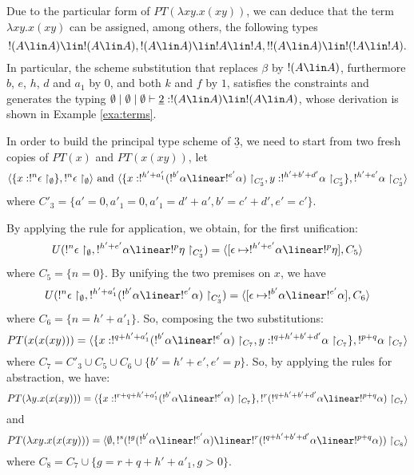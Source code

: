 \begin{exa}
  Due to the particular form of $PT(\lambda xy.x(xy))$, we can deduce
  that the term $\lambda xy.x(xy)$ can be assigned, among others,
  the following types
$$!(A \lin A)\lin !(A\lin A), !(A\lin A)\lin !A \lin !A, !!(A\lin
A)\lin !(!A \lin !A).
$$
  In particular, the scheme substitution that replaces $\beta$ by $!(A
  \lin A)$, furthermore $b$, $e$, $h$, $d$ and $a_1$ by $0$, and both
  $k$ and $f$ by $1$, satisfies the constraints and generates the
  typing $\emptyset \mid \emptyset \mid \emptyset \vdash
  \underline{2}:!(A \lin A) \lin !(A \lin A)$, whose derivation is
  shown in Example \ref{exa:terms}.

  In order to build the principal type scheme of $\underline{3}$, we
  need to start from two fresh copies of $PT(x)$ and $PT(x(xy))$, let
$$\langle \{x:!^{n} \epsilon \restriction_{\emptyset}\}, !^{n} \epsilon \restriction_{\emptyset}\rangle \mbox{   and   }
\langle \{x:!^{h'+a'_{1}}(!^{b'}\alpha \linear !^{e'}\alpha)\restriction_{C'_{3}}, y:!^{h'+b'+d'}\alpha\restriction_{C'_{3}}\},
!^{h'+e' }\alpha \restriction_{C'_{3}} \rangle
$$
  where $C'_{3}=\{a'=0,a'_{1}=0,a'_{1}=d'+a', b'=c'+d', e'=c' \}$.

  By applying the rule for application, we obtain, for the first
  unification:
$$U(!^{n} \epsilon\restriction_{\emptyset},!^{h'+e' }\alpha \linear !^{p}\eta\restriction_{C'_{3}} )= 
\langle [\epsilon \mapsto !^{h'+e' }\alpha \linear !^{p}\eta ],
C_{5}\rangle
$$
  where $C_{5}=\{n=0\}.$ By unifying the two premises on $x$, we have
$$U(!^{n} \epsilon\restriction_{\emptyset},
!^{h'+a'_{1}}(!^{b '}\alpha \linear !^{e'}\alpha)\restriction_{C'_{3}} )=\langle [\epsilon \mapsto !^{b '}\alpha \linear !^{e'}\alpha] 
, C_{6} \rangle
$$ 
  where $C_{6 }= \{n=h'+a'_{1}\}$. So, composing the two substitutions:
$$PT(x(x(xy)))=\langle \{x:!^{q+h'+a'_{1}}(!^{b'}\alpha \linear !^{e'}\alpha)\restriction_{C_{7}}, 
y:!^{q+h'+b'+d'} \alpha\restriction_{C_{7}} \},
!^{p+q}\alpha\restriction_{C_{7}} \rangle$$
  where $C_{7}=C'_{3}\cup C_{5}\cup C_{6}\cup \{b'=h'+e',e'=p  \}$.
  So, by applying the rules for abstraction, we have:
$$PT(\lambda y.x(x(xy)) )=\langle \{x:!^{r+q+h'+a'_{1}}(!^{b'}\alpha
\linear !^{e'}\alpha)\restriction_{C_{7}} \}, !^{r}(!^{q+h'+b'+d'}
\alpha \linear !^{p+q}\alpha)\restriction_{C_{7}}
\rangle
$$
  and
$$PT(\lambda x y.x(x(xy)) )=\langle \emptyset,!^{s}(!^{g}(!^{b'}\alpha
\linear !^{e'}\alpha) \linear !^{r}(!^{q+h'+b'+d'} \alpha \linear
!^{p+q}\alpha))\restriction_{C_{8}} \rangle
$$
  where $C_{8}=C_{7}\cup \{g=r+q+h'+a'_{1}, g>0   \}$.


\end{exa}
